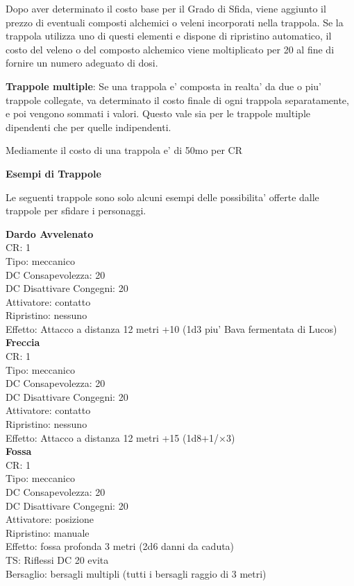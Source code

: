 \documentclass[a4paper,11pt,twoside,openany]{book}
\begin{document}
{Dopo aver determinato il costo base per il Grado di Sfida, viene aggiunto il prezzo di eventuali composti alchemici o veleni incorporati nella trappola. Se la trappola utilizza uno di questi elementi e dispone di ripristino automatico, il costo del veleno o del composto alchemico viene moltiplicato per 20 al fine di fornire un numero adeguato di dosi.

\textbf{Trappole multiple}: Se una trappola e' composta in realta' da due o piu' trappole collegate, va determinato il costo finale di ogni trappola separatamente, e poi vengono sommati i valori. Questo vale sia per le trappole multiple dipendenti che per quelle indipendenti.

Mediamente il costo di una trappola e' di 50mo per CR

\pagebreak

\textbf{Esempi di Trappole}

Le seguenti trappole sono solo alcuni esempi delle possibilita' offerte
dalle trappole per sfidare i personaggi.

\begin{multicols}{2}
	
\textbf{Dardo Avvelenato}\\
CR: 1 \\
Tipo: meccanico \\
DC Consapevolezza: 20 \\
DC Disattivare Congegni: 20 \\
Attivatore: contatto \\
Ripristino: nessuno \\
Effetto: Attacco a distanza 12 metri +10 (1d3 piu' Bava fermentata di Lucos)\\

\textbf{Freccia}\\
CR: 1 \\
Tipo: meccanico \\
DC Consapevolezza: 20 \\
DC Disattivare Congegni: 20 \\
Attivatore: contatto \\
Ripristino: nessuno \\
Effetto: Attacco a distanza 12 metri +15 (1d8+1/×3)\\

\textbf{Fossa}\\
CR: 1 \\
Tipo: meccanico \\
DC Consapevolezza: 20 \\
DC Disattivare Congegni: 20 \\
Attivatore: posizione \\
Ripristino: manuale \\
Effetto: fossa profonda 3 metri (2d6 danni da caduta) \\
TS: Riflessi DC 20 evita \\
Bersaglio: bersagli multipli (tutti i bersagli raggio di 3 metri)\\


\end{multicols}}
\end{document}
